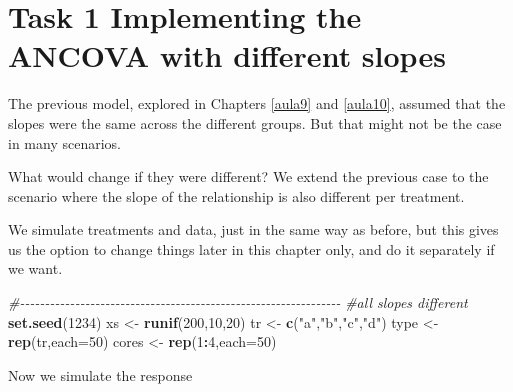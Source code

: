 \documentclass[
]{book}
\newenvironment{Shaded}{\begin{snugshade}}{\end{snugshade}}
\newcommand{\AttributeTok}[1]{\textcolor[rgb]{0.13,0.29,0.53}{#1}}
\newcommand{\CommentTok}[1]{\textcolor[rgb]{0.56,0.35,0.01}{\textit{#1}}}
\newcommand{\DecValTok}[1]{\textcolor[rgb]{0.00,0.00,0.81}{#1}}
\newcommand{\FunctionTok}[1]{\textcolor[rgb]{0.13,0.29,0.53}{\textbf{#1}}}
\newcommand{\NormalTok}[1]{#1}
\newcommand{\OtherTok}[1]{\textcolor[rgb]{0.56,0.35,0.01}{#1}}
\newcommand{\SpecialCharTok}[1]{\textcolor[rgb]{0.81,0.36,0.00}{\textbf{#1}}}
\newcommand{\StringTok}[1]{\textcolor[rgb]{0.31,0.60,0.02}{#1}}
\begin{document}
\hypertarget{task-1-implementing-the-ancova-with-different-slopes}{%
\section{Task 1 Implementing the ANCOVA with different slopes}\label{task-1-implementing-the-ancova-with-different-slopes}}

The previous model, explored in Chapters \ref{aula9} and \ref{aula10}, assumed that the slopes were the same across the different groups. But that might not be the case in many scenarios.

What would change if they were different? We extend the previous case to the scenario where the slope of the relationship is also different per treatment.

We simulate treatments and data, just in the same way as before, but this gives us the option to change things later in this chapter only, and do it separately if we want.

\begin{Shaded}
\begin{Highlighting}[]
\CommentTok{\#{-}{-}{-}{-}{-}{-}{-}{-}{-}{-}{-}{-}{-}{-}{-}{-}{-}{-}{-}{-}{-}{-}{-}{-}{-}{-}{-}{-}{-}{-}{-}{-}{-}{-}{-}{-}{-}{-}{-}{-}{-}{-}{-}{-}{-}{-}{-}{-}{-}{-}{-}{-}{-}{-}{-}{-}{-}{-}{-}{-}{-}{-}{-}{-}}
\CommentTok{\#all slopes different}
\FunctionTok{set.seed}\NormalTok{(}\DecValTok{1234}\NormalTok{)}
\NormalTok{xs }\OtherTok{\textless{}{-}} \FunctionTok{runif}\NormalTok{(}\DecValTok{200}\NormalTok{,}\DecValTok{10}\NormalTok{,}\DecValTok{20}\NormalTok{)}
\NormalTok{tr }\OtherTok{\textless{}{-}} \FunctionTok{c}\NormalTok{(}\StringTok{"a"}\NormalTok{,}\StringTok{"b"}\NormalTok{,}\StringTok{"c"}\NormalTok{,}\StringTok{"d"}\NormalTok{)}
\NormalTok{type }\OtherTok{\textless{}{-}} \FunctionTok{rep}\NormalTok{(tr,}\AttributeTok{each=}\DecValTok{50}\NormalTok{)}
\NormalTok{cores }\OtherTok{\textless{}{-}} \FunctionTok{rep}\NormalTok{(}\DecValTok{1}\SpecialCharTok{:}\DecValTok{4}\NormalTok{,}\AttributeTok{each=}\DecValTok{50}\NormalTok{)}
\end{Highlighting}
\end{Shaded}

Now we simulate the response
\end{document}

